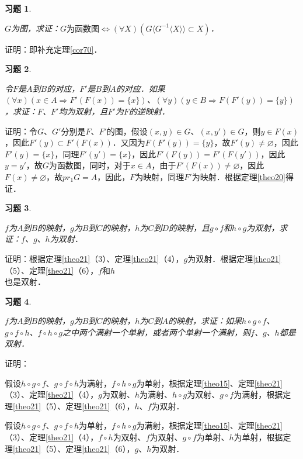 \documentclass[12pt, a4paper, oneside]{book}
\newtheorem{exer}{习题}
\begin{document}
			\begin{exer}\label{exer49}
				\hfill\par
				$G$为图，求证：$G\text{为函数图}\Leftrightarrow (\forall X)(G\langle G^{-1}\langle X \rangle \rangle\subset X)$．
			\end{exer}
			证明：即补充定理\ref{cor70}．
			
			\begin{exer}\label{exer50}
				\hfill\par
				令$F$是$A$到$B$的对应，$F'$是$B$到$A$的对应．如果$(\forall x)(x\in A\Rightarrow F'(F(x))=\{x\})$、$(\forall y)(y\in B\Rightarrow F(F'(y))=\{y\})$，求证：$F$、$F'$均为双射，且$F'$为$F$的逆映射．
			\end{exer}
			证明：令$G$、$G'$分别是$F$、$F'$的图，假设$(x, y)\in G$、$(x, y') \in G$，则$y\in F(x)$，因此$F'(y)\subset F'(F(x))$．又因为$F(F'(y))=\{y\}$，故$F'(y)\neq \varnothing$，因此$F'(y)=\{x\}$，同理$F'(y')=\{x\}$，因此$F'(F(y))= F'(F(y'))$，因此$y=y'$，故$G$为函数图，同时，对于$x\in A$，由于$F'(F(x))\neq \varnothing$，因此$F(x)\neq \varnothing$，故$pr_1G=A$，因此，$F$为映射，同理$F'$为映射．根据定理\ref{theo20}得证．
			
			\begin{exer}\label{exer51}
				\hfill\par
				$f$为$A$到$B$的映射，$g$为$B$到$C$的映射，$h$为$C$到$D$的映射，且$g\circ f$和$h\circ g$为双射，求证：$f$、$g$、$h$为双射．
			\end{exer}
			证明：根据定理\ref{theo21}（3）、定理\ref{theo21}（4），$g$为双射．根据定理\ref{theo21}（5）、定理\ref{theo21}（6），$f$和$h$\\也是双射．
			
			\begin{exer}\label{exer52}
				\hfill\par
				$f$为$A$到$B$的映射，$g$为$B$到$C$的映射，$h$为$C$到$A$的映射，求证：如果$h\circ g\circ f$、$g\circ f\circ h$、$f\circ h\circ g$之中两个满射一个单射，或者两个单射一个满射，则$f$、$g$、$h$都是双射．
			\end{exer}
			证明：
			\par
			假设$h\circ g\circ f$、$g\circ f\circ h$为满射，$f\circ h\circ g$为单射，根据定理\ref{theo15}、定理\ref{theo21}（3）、定理\ref{theo21}（4），$g$为双射、$h$为满射、$h\circ g$为双射、$g\circ f$为满射，根据定理\ref{theo21}（5）、定理\ref{theo21}（6），$h$、$f$为双射．
			\par
			假设$h\circ g\circ f$、$g\circ f\circ h$为单射，$f\circ h\circ g$为满射，根据定理\ref{theo15}、定理\ref{theo21}（3）、定理\ref{theo21}（4），$f\circ h$为双射、$f$为双射、$g\circ f$为单射、$h$为单射，根据定理\ref{theo21}（5）、定理\ref{theo21}（6），$g$、$h$为双射．
			
\end{document}

